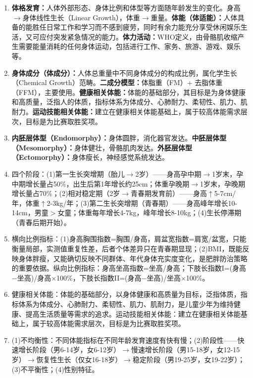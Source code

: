 \begin{enumerate}[leftmargin=*, itemsep=5pt]
    \item \textbf{体格发育：}人体外部形态、身体比例和体型等方面随年龄发生的变化。身高$\to$身体线性生长（Linear Growth），体重$\to$重量。\textbf{体能（体适能）：}人体具备的能胜任日常工作和学习而不感到疲劳，同时有余力能充分享受休闲娱乐生活，又可应付突发紧急情况的能力。\textbf{体力活动：}WHO定义，由骨骼肌收缩产生需要能量消耗的任何身体运动，包括进行工作、家务、旅游、游戏、娱乐等。

    \item \textbf{身体成分（体成分）：}人体总重量中不同身体成分的构成比例，属化学生长（Chemical Growth）范畴。\textbf{二成分模型：}体脂重（FM）+ 去脂体重（FFM），主要使用。\textbf{健康相关体能：}体能的基础部分，其目标是为身体健康和高质量，泛指人的体质，指标体系为体成分、心肺耐力、柔韧性、肌力、肌耐力。\textbf{运动技能相关体能：}建立在健康相关体能基础上，属于较高体能需求层次，目标是为比赛取胜奖项。

    \item \textbf{内胚层体型（Endomorphy）：}身体圆胖，消化器官发达。\textbf{中胚层体型（Mesomorphy）：}身体健壮，骨骼肌肉发达。\textbf{外胚层体型（Ectomorphy）：}身体瘦长，神经感觉系统发达。

    \item 四个阶段：(1)第一生长突增期（胎儿$\to$2岁）——身高孕中期$\to$1岁末，孕中期增长量占50\%，出生后第1年增长约25cm；体重孕晚期$\to$1岁末，孕晚期增长量占70\%；(2)相对稳定期（2岁$\to$青春期发育前）——身高$\uparrow$5-7cm/年，体重$\uparrow$2-3kg/年；(3)第二生长突增期（青春期）——身高峰年增长10-14cm，男童$>$女童；体重每年增长4-7kg，峰年增长8-10kg；(4)生长停滞期（青春后期开始）。

    \item 横向比例指标：(1)身高胸围指数=胸围/身高，肩盆宽指数=肩宽/盆宽，只能衡量局部，实测值重复性差，后者个体差异只在青春期显现；(2)BMI，既能反映身体胖瘦，又能确切反映不同群体、年代身体充实度变化，是肥胖防治策略的重要依据。纵向比例指标：身高坐高指数=坐高/身高；下肢长指数I=(身高$-$坐高)/身高$\times$100\%，下肢长指数II=(身高$-$坐高)/坐高$\times$100\%。

    \item 健康相关体能：体能的基础部分，以身体健康和高质量为目标，泛指体质，指标体系为体成分、心肺耐力、柔韧性、肌力、肌耐力，是儿童少年为维持健康、提高生活质量等需求的追求。运动技能相关体能：建立在健康相关体能基础上，属于较高体能需求层次，目标是为比赛取胜奖项。

    \item (1)不均衡性：不同体能指标在不同年龄发育速度有快有慢；(2)阶段性——快速增长阶段（男6-14岁，女6-12岁）$\to$慢速增长阶段（男15-18岁，女12-15岁）$\to$恢复性生长（仅女16-18岁）$\to$稳定阶段（男19-25岁，女19-22岁）；(3)不平衡性；(4)性别特征。


\end{enumerate}
